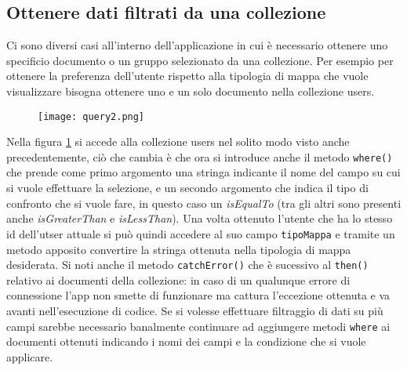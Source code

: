 \subsection{Ottenere dati filtrati da una collezione}
Ci sono diversi casi all'interno dell'applicazione in cui è necessario ottenere
uno specificio documento o un gruppo selezionato da una collezione. Per esempio
per ottenere la preferenza dell'utente rispetto alla tipologia di mappa che
vuole visualizzare bisogna ottenere uno e un solo documento nella collezione
users. \\
\begin{figure}[!h]
    \centering
    \texttt{[image: query2.png]}
    \caption{}
    \label{query2}
\end{figure}
Nella figura \ref{query2} si accede alla collezione users nel solito modo visto
anche precedentemente, ciò che cambia è che ora si introduce anche il metodo
\verb|where()| che prende come primo argomento una stringa indicante il nome del
campo su cui si vuole effettuare la selezione, e un secondo argomento che indica
il tipo di confronto che si vuole fare, in questo caso un \textit{isEqualTo}
(tra gli altri sono presenti anche \textit{isGreaterThan} e
\textit{isLessThan}). Una volta ottenuto l'utente che ha lo stesso id
dell'utser attuale si può quindi accedere al suo campo \verb|tipoMappa| e
tramite un metodo apposito convertire la stringa ottenuta nella tipologia di
mappa desiderata. Si noti anche il metodo \verb|catchError()| che è sucessivo al
\verb|then()| relativo ai documenti della collezione: in caso di un qualunque errore di
connessione l'app non smette di funzionare ma cattura l'eccezione ottenuta e va
avanti nell'esecuzione di codice. Se si volesse effettuare filtraggio di dati su
più campi sarebbe necessario banalmente continuare ad aggiungere metodi
\verb|where| ai documenti ottenuti indicando i nomi dei campi e la condizione
che si vuole applicare.


